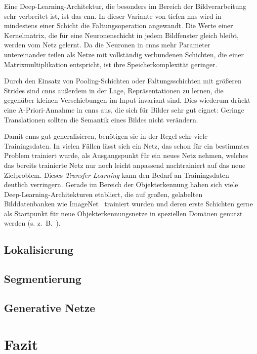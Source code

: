 Eine Deep-Learning-Architektur, die besonders im Bereich der Bildverarbeitung sehr verbreitet ist, ist das \gls{cnn}.
In dieser Variante von tiefen \glspl{nn} wird in mindestens einer Schicht die Faltungsoperation angewandt.
Die Werte einer Kernelmatrix, die für eine Neuronenschicht in jedem Bildfenster gleich bleibt, werden vom Netz gelernt.
Da die Neuronen in \glspl{cnn} mehr Parameter untereinander teilen als Netze mit vollständig verbundenen Schichten, die einer Matrixmultiplikation entspricht, ist ihre Speicherkomplexität geringer.

Durch den Einsatz von Pooling-Schichten oder Faltungsschichten mit größeren Strides sind \glspl{cnn} außerdem in der Lage, Repräsentationen zu lernen, die gegenüber kleinen Verschiebungen im Input invariant sind.
Dies wiederum drückt eine A-Priori-Annahme in \glspl{cnn} aus, die sich für Bilder sehr gut eignet:
Geringe Translationen sollten die Semantik eines Bildes nicht verändern.

Damit \glspl{cnn} gut generalisieren, benötigen sie in der Regel sehr viele Trainingsdaten.
In vielen Fällen lässt sich ein Netz, das schon für ein bestimmtes Problem trainiert wurde, als Ausgangspunkt für ein neues Netz nehmen, welches das bereits trainierte Netz nur noch leicht anpassend nachtrainiert auf das neue Zielproblem.
Dieses \emph{Transfer Learning} kann den Bedarf an Trainingsdaten deutlich verringern.
Gerade im Bereich der Objekterkennung haben sich viele Deep-Learning-Architekturen etabliert, die auf großen, gelabelten Bilddatenbanken wie ImageNet~\cite{Deng.2009} trainiert wurden und deren erste Schichten gerne als Startpunkt für neue Objekterkennungsnetze in speziellen Domänen genutzt werden (s. z.~B.~\cite{Simonyan.2014}).



\subsection{Lokalisierung}





\subsection{Segmentierung}





\subsection{Generative Netze}





\section{Fazit}


